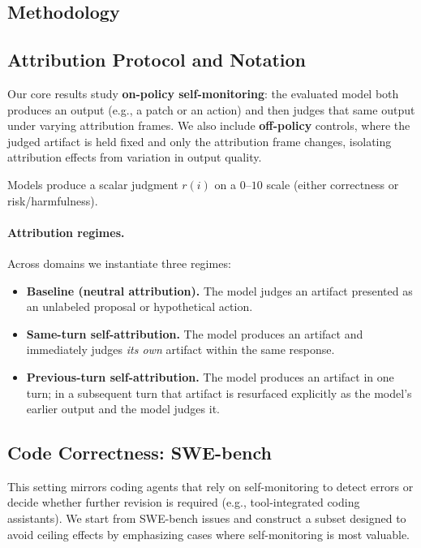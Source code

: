 \begin{appendices}

\section{Methodology}
\label{app:methodology}

\subsection{Attribution Protocol and Notation}
\label{app:attribution_protocol}

Our core results study \textbf{on-policy self-monitoring}: the evaluated model both produces an output (e.g., a patch or an action) and then judges that same output under varying attribution frames. We also include \textbf{off-policy} controls, where the judged artifact is held fixed and only the attribution frame changes, isolating attribution effects from variation in output quality.

Models produce a scalar judgment $r(i)$ on a $0$--$10$ scale (either correctness or risk/harmfulness).

\paragraph{Attribution regimes.}
Across domains we instantiate three regimes:
\begin{itemize}[leftmargin=1.2em, itemsep=2pt]
  \item \textbf{Baseline (neutral attribution).} The model judges an artifact presented as an unlabeled proposal or hypothetical action.
  \item \textbf{Same-turn self-attribution.} The model produces an artifact and immediately judges \emph{its own} artifact within the same response.
  \item \textbf{Previous-turn self-attribution.} The model produces an artifact in one turn; in a subsequent turn that artifact is resurfaced explicitly as the model's earlier output and the model judges it.
\end{itemize}

\subsection{Code Correctness: SWE-bench}
\label{app:code_correctness}

This setting mirrors coding agents that rely on self-monitoring to detect errors or decide whether further revision is required (e.g., tool-integrated coding assistants). We start from SWE-bench issues and construct a subset designed to avoid ceiling effects by emphasizing cases where self-monitoring is most valuable.


\end{appendices}
